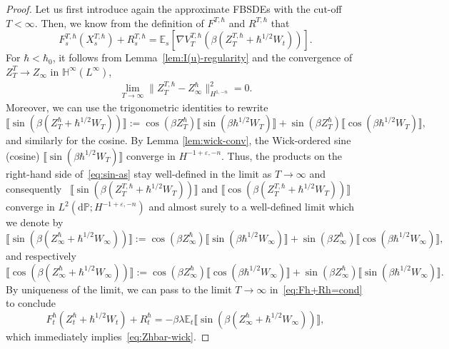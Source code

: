 \documentclass[11pt, a4paper]{scrartcl}
\numberwithin{equation}{section}
\theoremstyle{plain}
\theoremstyle{remark}
\newcommand{\assign}{:=}
\newcommand{\mathd}{\mathrm{d}}
\begin{document}
\begin{proof}
	Let us first introduce again the approximate FBSDEs with the cut-off $T <
		\infty$. Then, we know from the definition of $F^{T, \hbar}$ and $R^{T,
				\hbar}$ that
	\begin{equation}
		F^{T, \hbar}_s (X^{T, \hbar}_s) + R^{T, \hbar}_s =\mathbb{E}_s [\nabla
		V^{T, \hbar}_T (\beta (Z_T^{T, \hbar} + \hbar^{1 / 2} W_t))] .
		\label{eq:Fh+Rh=cond}
	\end{equation}
	For $\hbar < \hbar_0$, it follows from Lemma~\ref{lem:I(u)-regularity} and
	the convergence of $Z^T_T \rightarrow Z_{\infty}$ in $\mathbb{H}^{\infty}
		(L^{\infty})$,
	\[ \begin{aligned}
			\lim_{T \rightarrow \infty} \| Z_T^{T, \hbar} - Z^{\hbar}_{\infty}
			\|_{H^{1, - n}}^2 = 0.
		\end{aligned} \]
	Moreover, we can use the trigonometric identities to rewrite
	\begin{equation}
		\llbracket \sin (\beta (Z^{\hbar}_T + \hbar^{1 / 2} W_T)) \rrbracket
		\assign \cos (\beta Z^{\hbar}_T) \llbracket \sin (\beta \hbar^{1 / 2} W_T)
		\rrbracket + \sin (\beta Z^{\hbar}_T) \llbracket \cos (\beta \hbar^{1 / 2}
		W_T) \rrbracket, \label{eq:sin-as}
	\end{equation}
	and similarly for the cosine. By Lemma \ref{lem:wick-conv}, the Wick-ordered
	sine (cosine) $\llbracket \sin (\beta \hbar^{1 / 2} W_T) \rrbracket$
	converge in $H^{- 1 + \varepsilon, - n}$. Thus, the products on the
	right-hand side of~\eqref{eq:sin-as} stay well-defined in the limit as $T
		\rightarrow \infty$ and consequently \ $\llbracket \sin (\beta (Z^{T,
				\hbar}_T + \hbar^{1 / 2} W_T)) \rrbracket$ and $\llbracket \cos (\beta
			(Z^{T, \hbar}_T + \hbar^{1 / 2} W_T)) \rrbracket$ converge in $L^2 (\mathd \mathbb{P}
		; H^{- 1 + \varepsilon, - n})$ and almost surely to a well-defined limit
	which we denote by
	\begin{equation}
		\llbracket \sin (\beta (Z^{\hbar}_{\infty} + \hbar^{1 / 2} W_{\infty}))
		\rrbracket \assign \cos (\beta Z^{\hbar}_{\infty}) \llbracket \sin (\beta
		\hbar^{1 / 2} W_{\infty}) \rrbracket + \sin (\beta Z^{\hbar}_{\infty})
		\llbracket \cos (\beta \hbar^{1 / 2} W_{\infty}) \rrbracket,
		\label{eq:def-Vinfty}
	\end{equation}
	and respectively
	\[ \llbracket \cos (\beta (Z^{\hbar}_{\infty} + \hbar^{1 / 2} W_{\infty}))
		\rrbracket \assign \cos (\beta Z^{\hbar}_{\infty}) \llbracket \cos (\beta
		\hbar^{1 / 2} W_{\infty}) \rrbracket + \sin (\beta Z^{\hbar}_{\infty})
		\llbracket \sin (\beta \hbar^{1 / 2} W_{\infty}) \rrbracket . \]
	By uniqueness of the limit, we can pass to the limit $T \rightarrow \infty$
	in~\eqref{eq:Fh+Rh=cond} to conclude
	\[ F_t^{\hbar} (Z_t^{\hbar} + \hbar^{1 / 2} W_t) + R_t^{\hbar} = - \beta
		\lambda \mathbb{E}_t \llbracket \sin (\beta (Z^{\hbar}_{\infty} +
			\hbar^{1 / 2} W_{\infty})) \rrbracket, \]
	which immediately implies~\eqref{eq:Zhbar-wick}.
\end{proof}
\end{document}
